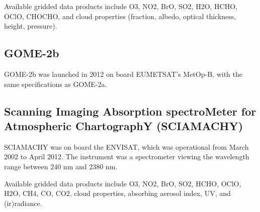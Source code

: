 Available gridded data products include O3, NO2, BrO, SO2, H2O, HCHO, OClO, CHOCHO, and cloud properties (fraction, albedo, optical thickness, height, pressure).

\subsection{GOME-2b}

GOME-2b was launched in 2012 on board EUMETSAT's MetOp-B, with the same specifications as GOME-2a.

\subsection{Scanning Imaging Absorption spectroMeter for Atmospheric ChartographY (SCIAMACHY)}

SCIAMACHY was on board the ENVISAT, which was operational from March 2002 to April 2012.
The instrument was a spectrometer viewing the wavelength range between 240 nm and 2380 nm. 

Available gridded data products include O3, NO2, BrO, SO2, HCHO, OClO, H2O, CH4, CO, CO2, cloud properties, absorbing aerosol index, UV, and (ir)radiance.

